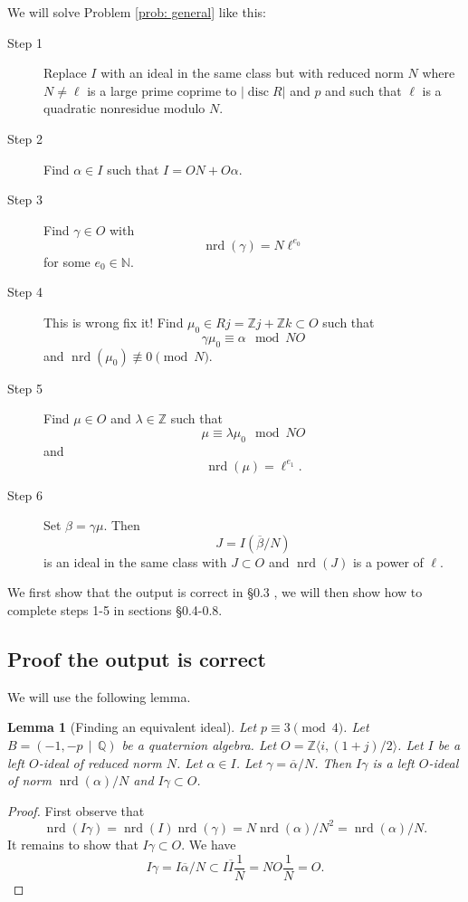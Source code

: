 \documentclass[10pt]{article}
\theoremstyle{plain}
\newtheorem{lemma}[theorem]{Lemma}
\theoremstyle{definition}
\newcommand{\op}{\operatorname}
\newcommand{\N}{\mathbb{N}}
\newcommand{\Z}{\mathbb{Z}}
\newcommand{\Q}{\mathbb{Q}}
\newcommand{\nrd}{\op{nrd}}
\newcommand{\disc}{\op{disc}}
\begin{document}
We will solve Problem \ref{prob: general} like this:

\begin{description}
    \item[Step 1]
    Replace \( I \) with an ideal in the same class but with reduced norm \( N \) where \( N \neq \ell \) is a large prime coprime to \( |\disc R| \) and \( p \) and such that \( \ell \) is a quadratic nonresidue modulo \( N \).

    \item[Step 2]
    Find \( \alpha \in I \) such that \( I = ON + O\alpha \).

    \item[Step 3]
    Find \( \gamma \in O \) with
    \[
        \nrd(\gamma) = N \ell^{e_0}
    \]
    for some \( e_0 \in \N \).

    \item[Step 4]
          {\color{red} This is wrong fix it!}
    Find \( \mu_0 \in Rj = \Z j + \Z k \subset  O \) such that
    \[
        \gamma\mu_0 \equiv \alpha \mod NO
    \]
    and \( \nrd(\mu_0) \not\equiv 0 \pmod{N} \).

    \item[Step 5]
    Find \( \mu \in  O \) and \( \lambda \in \Z \) such that
    \[
        \mu \equiv \lambda \mu_0 \mod NO
    \]
    and
    \[
        \nrd(\mu) = \ell^{e_1}.
    \]

    \item[Step 6]
    Set \( \beta = \gamma \mu \).
    Then
    \[
        J = I(\overline{\beta}/N)
    \]
    is an ideal in the same class with \( J \subset O \) and \( \nrd(J) \) is a power of \( \ell \).
\end{description}


We first show that the output is correct in \S 0.3 , we will then show how to complete steps 1-5 in sections \S 0.4-0.8.

\subsection{Proof the output is correct}
We will use the following lemma.
\begin{lemma}[Finding an equivalent ideal] \label{lem: change norm}
    Let \( p \equiv 3 \pmod{4} \).
    Let \( B =  (-1, -p \, \mid \, \Q) \) be a quaternion algebra.
    Let \( O = \Z \langle i, (1+j) / 2 \rangle \).
    Let \( I \) be a left \( O \)-ideal of reduced norm \( N \).
    Let \( \alpha \in I \).
    Let \( \gamma = \overline{\alpha} / N \).
    Then \( I \gamma \) is a left \( O \)-ideal of norm \( \nrd(\alpha) / N \) and \( I \gamma \subset O \).
\end{lemma}
\begin{proof}
    First observe that
    \[
        \nrd(I \gamma) = \nrd(I)\nrd(\gamma) = N \nrd(\alpha) / N^2 = \nrd(\alpha) / N.
    \]
    It remains to show that \( I\gamma \subset O \).
    We have
    \[
        I\gamma = I\overline{\alpha} / N \subset I\overline{I} \frac{1}{N} = NO \frac{1}{N} = O.
    \]
\end{proof}
\end{document}
